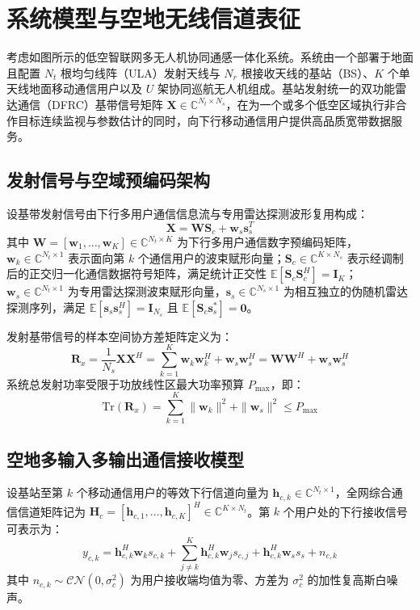 \section{系统模型与空地无线信道表征}
\label{sec:system_model}

考虑如图所示的低空智联网多无人机协同通感一体化系统。系统由一个部署于地面且配置 $N_t$ 根均匀线阵（ULA）发射天线与 $N_r$ 根接收天线的基站（BS）、$K$ 个单天线地面移动通信用户以及 $U$ 架协同巡航无人机组成。基站发射统一的双功能雷达通信（DFRC）基带信号矩阵 $\mathbf{X} \in \mathbb{C}^{N_t \times N_s}$，在为一个或多个低空区域执行非合作目标连续监视与参数估计的同时，向下行移动通信用户提供高品质宽带数据服务。

\subsection{发射信号与空域预编码架构}
设基带发射信号由下行多用户通信信息流与专用雷达探测波形复用构成：
\begin{equation}
  \mathbf{X} = \mathbf{W}\mathbf{S}_c + \mathbf{w}_s \mathbf{s}_s^T
\end{equation}
其中 $\mathbf{W} = [\mathbf{w}_1, \dots, \mathbf{w}_K] \in \mathbb{C}^{N_t \times K}$ 为下行多用户通信数字预编码矩阵，$\mathbf{w}_k \in \mathbb{C}^{N_t \times 1}$ 表示面向第 $k$ 个通信用户的波束赋形向量；$\mathbf{S}_c \in \mathbb{C}^{K \times N_s}$ 表示经调制后的正交归一化通信数据符号矩阵，满足统计正交性 $\mathbb{E}[\mathbf{S}_c \mathbf{S}_c^H] = \mathbf{I}_K$；$\mathbf{w}_s \in \mathbb{C}^{N_t \times 1}$ 为专用雷达探测波束赋形向量，$\mathbf{s}_s \in \mathbb{C}^{N_s \times 1}$ 为相互独立的伪随机雷达探测序列，满足 $\mathbb{E}[\mathbf{s}_s \mathbf{s}_s^H] = \mathbf{I}_{N_s}$ 且 $\mathbb{E}[\mathbf{S}_c \mathbf{s}_s^*] = \mathbf{0}$。

发射基带信号的样本空间协方差矩阵定义为：
\begin{equation}
  \mathbf{R}_x = \frac{1}{N_s}\mathbf{X}\mathbf{X}^H = \sum_{k=1}^K \mathbf{w}_k \mathbf{w}_k^H + \mathbf{w}_s \mathbf{w}_s^H = \mathbf{W}\mathbf{W}^H + \mathbf{w}_s \mathbf{w}_s^H
\end{equation}
系统总发射功率受限于功放线性区最大功率预算 $P_{\max}$，即：
\begin{equation}
  \mathrm{Tr}(\mathbf{R}_x) = \sum_{k=1}^K \|\mathbf{w}_k\|^2 + \|\mathbf{w}_s\|^2 \le P_{\max}
\end{equation}

\subsection{空地多输入多输出通信接收模型}
设基站至第 $k$ 个移动通信用户的等效下行信道向量为 $\mathbf{h}_{c,k} \in \mathbb{C}^{N_t \times 1}$，全网综合通信信道矩阵记为 $\mathbf{H}_c = [\mathbf{h}_{c,1}, \dots, \mathbf{h}_{c,K}]^H \in \mathbb{C}^{K \times N_t}$。第 $k$ 个用户处的下行接收信号可表示为：
\begin{equation}
  y_{c,k} = \mathbf{h}_{c,k}^H \mathbf{w}_k s_{c,k} + \sum_{j \ne k}^K \mathbf{h}_{c,k}^H \mathbf{w}_j s_{c,j} + \mathbf{h}_{c,k}^H \mathbf{w}_s s_s + n_{c,k}
\end{equation}
其中 $n_{c,k} \sim \mathcal{CN}(0, \sigma_c^2)$ 为用户接收端均值为零、方差为 $\sigma_c^2$ 的加性复高斯白噪声。


